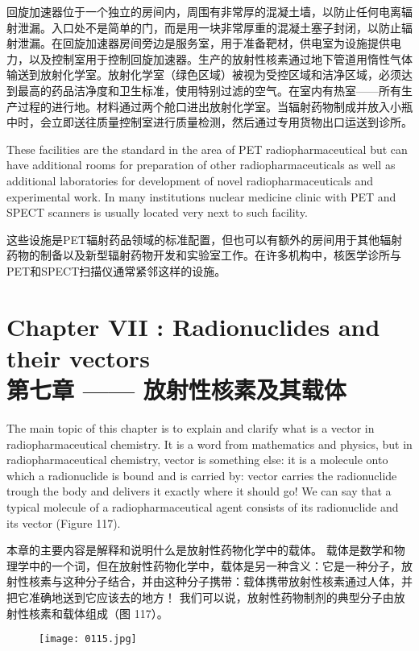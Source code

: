 \documentclass[dvipsnames, svgnames,a4paper,11pt]{article}
\begin{document}
回旋加速器位于一个独立的房间内，周围有非常厚的混凝土墙，以防止任何电离辐射泄漏。入口处不是简单的门，而是用一块非常厚重的混凝土塞子封闭，以防止辐射泄漏。在回旋加速器房间旁边是服务室，用于准备靶材，供电室为设施提供电力，以及控制室用于控制回旋加速器。生产的放射性核素通过地下管道用惰性气体输送到放射化学室。放射化学室（绿色区域）被视为受控区域和洁净区域，必须达到最高的药品洁净度和卫生标准，使用特别过滤的空气。在室内有热室——所有生产过程的进行地。材料通过两个舱口进出放射化学室。当辐射药物制成并放入小瓶中时，会立即送往质量控制室进行质量检测，然后通过专用货物出口运送到诊所。



These facilities are the standard in the area of PET radiopharmaceutical but can
have additional rooms for preparation of other radiopharmaceuticals as well as
additional laboratories for development of novel radiopharmaceuticals and
experimental work. In many institutions nuclear medicine clinic with PET and SPECT
scanners is usually located very next to such facility.

这些设施是PET辐射药品领域的标准配置，但也可以有额外的房间用于其他辐射药物的制备以及新型辐射药物开发和实验室工作。在许多机构中，核医学诊所与PET和SPECT扫描仪通常紧邻这样的设施。

\newpage

\section{Chapter VII : Radionuclides and their vectors\\第七章 —— 放射性核素及其载体}
The main topic of this chapter is to explain and clarify what is a vector in
radiopharmaceutical chemistry. It is a word from mathematics and physics, but in
radiopharmaceutical chemistry, vector is something else: it is a molecule onto which
a radionuclide is bound and is carried by: vector carries the radionuclide trough the
body and delivers it exactly where it should go! We can say that a typical molecule of
a radiopharmaceutical agent consists of its radionuclide and its vector (Figure 117).

本章的主要内容是解释和说明什么是放射性药物化学中的载体。 载体是数学和物理学中的一个词，但在放射性药物化学中，载体是另一种含义：它是一种分子，放射性核素与这种分子结合，并由这种分子携带：载体携带放射性核素通过人体，并把它准确地送到它应该去的地方！ 我们可以说，放射性药物制剂的典型分子由放射性核素和载体组成（图 117）。

\begin{figure}[h]
    \centering
    \texttt{[image: 0115.jpg]}
     \label{fig117}
\end{figure}
\end{document}
